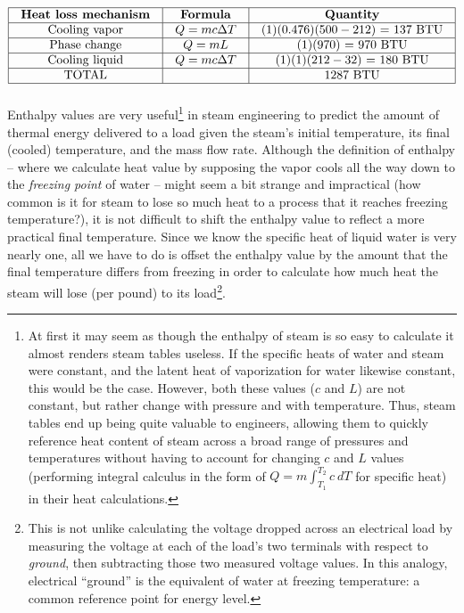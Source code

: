 $$\vbox{\offinterlineskip
\halign{\strut
\vrule \quad\hfil # \ \hfil & 
\vrule \quad\hfil # \ \hfil & 
\vrule \quad\hfil # \ \hfil \vrule \cr
\noalign{\hrule}
%
\textbf{Heat loss mechanism} & \textbf{Formula} & \textbf{Quantity} \cr
%
\noalign{\hrule}
%
Cooling vapor & $Q = mc \Delta T$ & (1)(0.476)($500-212$) = 137 BTU \cr
%
\noalign{\hrule}
%
Phase change & $Q = mL$ & (1)(970) = 970 BTU \cr
%
\noalign{\hrule}
%
Cooling liquid & $Q = mc \Delta T$ & (1)(1)($212-32$) = 180 BTU \cr
%
\noalign{\hrule}
%
TOTAL &  & 1287 BTU \cr
%
\noalign{\hrule}
} %
}$$ %

Enthalpy values are very useful\footnote{At first it may seem as though the enthalpy of steam is so easy to calculate it almost renders steam tables useless.  If the specific heats of water and steam were constant, and the latent heat of vaporization for water likewise constant, this would be the case.  However, both these values ($c$ and $L$) are not constant, but rather change with pressure and with temperature.  Thus, steam tables end up being quite valuable to engineers, allowing them to quickly reference heat content of steam across a broad range of pressures and temperatures without having to account for changing $c$ and $L$ values (performing integral calculus in the form of $Q = m \int_{T_1}^{T_2} c \> dT$ for specific heat) in their heat calculations.} in steam engineering to predict the amount of thermal energy delivered to a load given the steam's initial temperature, its final (cooled) temperature, and the mass flow rate.  Although the definition of enthalpy -- where we calculate heat value by supposing the vapor cools all the way down to the \textit{freezing point} of water -- might seem a bit strange and impractical (how common is it for steam to lose so much heat to a process that it reaches freezing temperature?), it is not difficult to shift the enthalpy value to reflect a more practical final temperature.  Since we know the specific heat of liquid water is very nearly one, all we have to do is offset the enthalpy value by the amount that the final temperature differs from freezing in order to calculate how much heat the steam will lose (per pound) to its load\footnote{This is not unlike calculating the voltage dropped across an electrical load by measuring the voltage at each of the load's two terminals with respect to \textit{ground}, then subtracting those two measured voltage values.  In this analogy, electrical ``ground'' is the equivalent of water at freezing temperature: a common reference point for energy level.}.  

